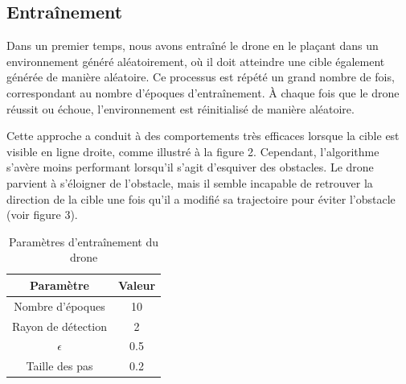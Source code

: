 \documentclass[a4paper, 12pt]{article}
\begin{document}
\subsection{Entraînement}
Dans un premier temps, nous avons entraîné le drone en le plaçant dans un environnement généré aléatoirement, où il doit atteindre une cible également générée de manière aléatoire. Ce processus est répété un grand nombre de fois, correspondant au nombre d'époques d'entraînement. À chaque fois que le drone réussit ou échoue, l'environnement est réinitialisé de manière aléatoire.

Cette approche a conduit à des comportements très efficaces lorsque la cible est visible en ligne droite, comme illustré à la figure 2. Cependant, l'algorithme s'avère moins performant lorsqu'il s'agit d'esquiver des obstacles. Le drone parvient à s'éloigner de l'obstacle, mais il semble incapable de retrouver la direction de la cible une fois qu'il a modifié sa trajectoire pour éviter l'obstacle (voir figure 3).
\begin{table}[H]
    \centering
    \begin{tabular}{|c|c|}
        \hline
        \textbf{Paramètre} & \textbf{Valeur} \\
        \hline
        Nombre d'époques & 10 \\
        Rayon de détection & 2 \\
        $\epsilon$ & 0.5 \\
        Taille des pas & 0.2 \\
        \hline
    \end{tabular}
    \caption{Paramètres d'entraînement du drone}
    \label{tab:training-parameters}
\end{table}
\end{document}

